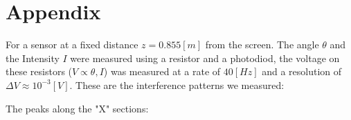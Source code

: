 \section{Appendix}
For a sensor at a fixed distance $z=0.855 [m]$ from the screen.
The angle $\theta$ and the Intensity $I$ were measured using a resistor and a photodiod, the voltage on these resistors ($V\propto\theta,I$) was
measured at a rate of $40[Hz]$ and a resolution of $\Delta V\approx10^{-3}[V]$.
These are the interference patterns we measured:



The peaks along the "X" sections:
